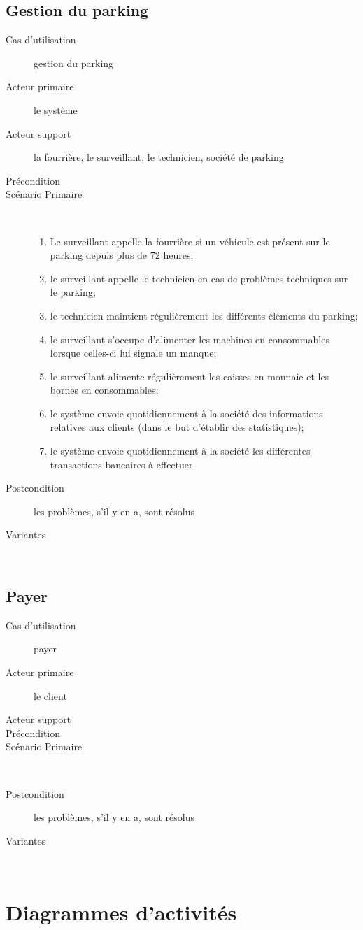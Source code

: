 \documentclass[a4paper]{article}
\begin{document}
\subsection{Gestion du parking}
\begin{description}
	\item[Cas d'utilisation] gestion du parking
	\item[Acteur primaire] le syst\`eme
	\item[Acteur support]  la fourri\`ere, le surveillant, le technicien, soci\'et\'e
				de parking
	\item[Pr\'econdition] 
	\item[Sc\'enario Primaire] \
	\begin{enumerate}
		\item Le surveillant appelle la fourri\`ere si un v\'ehicule est
		pr\'esent sur le parking depuis plus de $72$ heures;
		\item le surveillant appelle le technicien en cas de probl\`emes
		techniques sur le parking;
		\item le technicien maintient r\'eguli\`erement les diff\'erents
		\'el\'ements du parking;
		\item le surveillant s'occupe d'alimenter les machines en consommables
		lorsque celles-ci lui signale un manque;
		\item le surveillant alimente r\'eguli\`erement les caisses en
		monnaie et les bornes en consommables;
		\item le syst\`eme envoie quotidiennement \`a la soci\'et\'e des
		informations relatives aux clients (dans le but d'\'etablir des
		statistiques);
		\item le syst\`eme envoie quotidiennement \`a la soci\'et\'e les
		diff\'erentes transactions bancaires \`a effectuer.
	\end{enumerate}
	\item[Postcondition] les probl\`emes, s'il y en a, sont r\'esolus
	\item[Variantes] \
\end{description}

\subsection{Payer}
\begin{description}
	\item[Cas d'utilisation] payer
	\item[Acteur primaire] le client
	\item[Acteur support]  
	\item[Pr\'econdition] 
	\item[Sc\'enario Primaire] \
	\begin{enumerate}
	\end{enumerate}
	\item[Postcondition] les probl\`emes, s'il y en a, sont r\'esolus
	\item[Variantes] \
\end{description}

\section{Diagrammes d'activit\'es}
\end{document}
